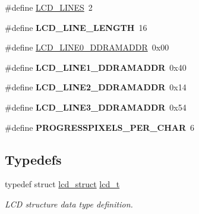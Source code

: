 \begin{DoxyCompactItemize}
\item 
\#define \hyperlink{group__ex4__lcd_ga01212e90283511562039db786f65ba98}{L\-C\-D\-\_\-\-L\-I\-N\-E\-S}~2
\item 
\hypertarget{group__ex4__lcd_gae59a728d9dee9f12c817b29d38746ed9}{\#define {\bfseries L\-C\-D\-\_\-\-L\-I\-N\-E\-\_\-\-L\-E\-N\-G\-T\-H}~16}\label{group__ex4__lcd_gae59a728d9dee9f12c817b29d38746ed9}

\item 
\#define \hyperlink{group__ex4__lcd_gaee2112f798cd153de3afb905653ca987}{L\-C\-D\-\_\-\-L\-I\-N\-E0\-\_\-\-D\-D\-R\-A\-M\-A\-D\-D\-R}~0x00
\item 
\hypertarget{group__ex4__lcd_gad965b49ee7837b0d99bbd5b5e2f83454}{\#define {\bfseries L\-C\-D\-\_\-\-L\-I\-N\-E1\-\_\-\-D\-D\-R\-A\-M\-A\-D\-D\-R}~0x40}\label{group__ex4__lcd_gad965b49ee7837b0d99bbd5b5e2f83454}

\item 
\hypertarget{group__ex4__lcd_gafacc9e73df471c77c004606efe6e3ffe}{\#define {\bfseries L\-C\-D\-\_\-\-L\-I\-N\-E2\-\_\-\-D\-D\-R\-A\-M\-A\-D\-D\-R}~0x14}\label{group__ex4__lcd_gafacc9e73df471c77c004606efe6e3ffe}

\item 
\hypertarget{group__ex4__lcd_ga8f667a445505409602337d961a995127}{\#define {\bfseries L\-C\-D\-\_\-\-L\-I\-N\-E3\-\_\-\-D\-D\-R\-A\-M\-A\-D\-D\-R}~0x54}\label{group__ex4__lcd_ga8f667a445505409602337d961a995127}

\item 
\hypertarget{group__ex4__lcd_ga8299126ee3ed92fc271bba9f0f16fa50}{\#define {\bfseries P\-R\-O\-G\-R\-E\-S\-S\-P\-I\-X\-E\-L\-S\-\_\-\-P\-E\-R\-\_\-\-C\-H\-A\-R}~6}\label{group__ex4__lcd_ga8299126ee3ed92fc271bba9f0f16fa50}

\end{DoxyCompactItemize}
\subsection*{Typedefs}
\begin{DoxyCompactItemize}
\item 
\hypertarget{group__ex4__lcd_gaccd6879dfbc1d7329824e4d44ecbfab9}{typedef struct \hyperlink{structlcd__struct}{lcd\-\_\-struct} \hyperlink{group__ex4__lcd_gaccd6879dfbc1d7329824e4d44ecbfab9}{lcd\-\_\-t}}\label{group__ex4__lcd_gaccd6879dfbc1d7329824e4d44ecbfab9}

\begin{DoxyCompactList}\small\item\em L\-C\-D structure data type definition. \end{DoxyCompactList}\end{DoxyCompactItemize}

